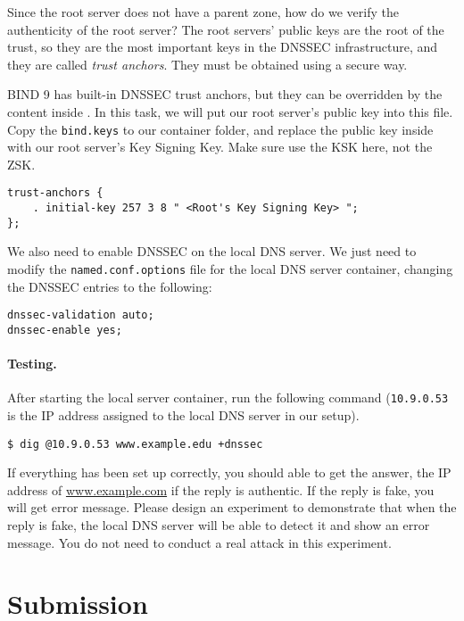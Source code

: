 Since the root server does not have a parent zone, how do we verify the authenticity 
of the root server?  The root servers' public keys are the root of the trust, so they are 
the most important keys in the DNSSEC infrastructure, and they are called \textit{trust
anchors}. They must be obtained using a secure way. 

BIND 9 has built-in DNSSEC trust anchors, but they can be 
overridden by the content inside .  
In this task, we will put our root server's public key 
into this file. Copy the \texttt{bind.keys} to our container folder,
and replace the public key inside with our root server's 
Key Signing Key. Make sure use the KSK here, not the ZSK. 


\begin{lstlisting}
trust-anchors {
    . initial-key 257 3 8 " <Root's Key Signing Key> ";
};
\end{lstlisting}

We also need to enable DNSSEC on the local DNS server.
We just need to
modify the \texttt{named.conf.options} file for the local DNS
server container, changing the DNSSEC entries to the following:

\begin{lstlisting}
dnssec-validation auto;
dnssec-enable yes;
\end{lstlisting}



\paragraph{Testing.} After starting the local server container, run the 
following command (\texttt{10.9.0.53} is the IP address 
assigned to the local DNS server in our setup).

\begin{lstlisting}
$ dig @10.9.0.53 www.example.edu +dnssec
\end{lstlisting}

If everything has been set up correctly, you should able to get the 
answer, the IP address of \url{www.example.com} if the reply 
is authentic. If the reply is fake, you will get error message. 
Please design an experiment to demonstrate that when the reply 
is fake, the local DNS server will be able to detect it and 
show an error message. You do not need to conduct a real attack 
in this experiment. 



\section{Submission}





